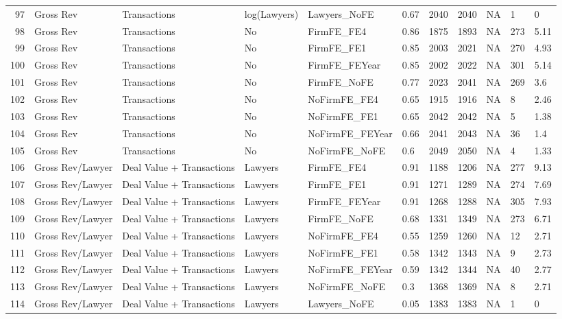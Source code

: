 \documentclass{article}
\begin{document}
\begin{table}[H]
\begin{tabular}{rllllllllll}
  97 & Gross Rev & Transactions & log(Lawyers) & Lawyers\_NoFE & 0.67 & 2040 & 2040 & NA & 1 & 0 \\ 
  98 & Gross Rev & Transactions & No & FirmFE\_FE4 & 0.86 & 1875 & 1893 & NA & 273 & 5.11 \\ 
  99 & Gross Rev & Transactions & No & FirmFE\_FE1 & 0.85 & 2003 & 2021 & NA & 270 & 4.93 \\ 
  100 & Gross Rev & Transactions & No & FirmFE\_FEYear & 0.85 & 2002 & 2022 & NA & 301 & 5.14 \\ 
  101 & Gross Rev & Transactions & No & FirmFE\_NoFE & 0.77 & 2023 & 2041 & NA & 269 & 3.6 \\ 
  102 & Gross Rev & Transactions & No & NoFirmFE\_FE4 & 0.65 & 1915 & 1916 & NA & 8 & 2.46 \\ 
  103 & Gross Rev & Transactions & No & NoFirmFE\_FE1 & 0.65 & 2042 & 2042 & NA & 5 & 1.38 \\ 
  104 & Gross Rev & Transactions & No & NoFirmFE\_FEYear & 0.66 & 2041 & 2043 & NA & 36 & 1.4 \\ 
  105 & Gross Rev & Transactions & No & NoFirmFE\_NoFE & 0.6 & 2049 & 2050 & NA & 4 & 1.33 \\ 
  106 & Gross Rev/Lawyer & Deal Value + Transactions & Lawyers & FirmFE\_FE4 & 0.91 & 1188 & 1206 & NA & 277 & 9.13 \\ 
  107 & Gross Rev/Lawyer & Deal Value + Transactions & Lawyers & FirmFE\_FE1 & 0.91 & 1271 & 1289 & NA & 274 & 7.69 \\ 
  108 & Gross Rev/Lawyer & Deal Value + Transactions & Lawyers & FirmFE\_FEYear & 0.91 & 1268 & 1288 & NA & 305 & 7.93 \\ 
  109 & Gross Rev/Lawyer & Deal Value + Transactions & Lawyers & FirmFE\_NoFE & 0.68 & 1331 & 1349 & NA & 273 & 6.71 \\ 
  110 & Gross Rev/Lawyer & Deal Value + Transactions & Lawyers & NoFirmFE\_FE4 & 0.55 & 1259 & 1260 & NA & 12 & 2.71 \\ 
  111 & Gross Rev/Lawyer & Deal Value + Transactions & Lawyers & NoFirmFE\_FE1 & 0.58 & 1342 & 1343 & NA & 9 & 2.73 \\ 
  112 & Gross Rev/Lawyer & Deal Value + Transactions & Lawyers & NoFirmFE\_FEYear & 0.59 & 1342 & 1344 & NA & 40 & 2.77 \\ 
  113 & Gross Rev/Lawyer & Deal Value + Transactions & Lawyers & NoFirmFE\_NoFE & 0.3 & 1368 & 1369 & NA & 8 & 2.71 \\ 
  114 & Gross Rev/Lawyer & Deal Value + Transactions & Lawyers & Lawyers\_NoFE & 0.05 & 1383 & 1383 & NA & 1 & 0 \\ 

\end{tabular}
\end{table}
\end{document}
